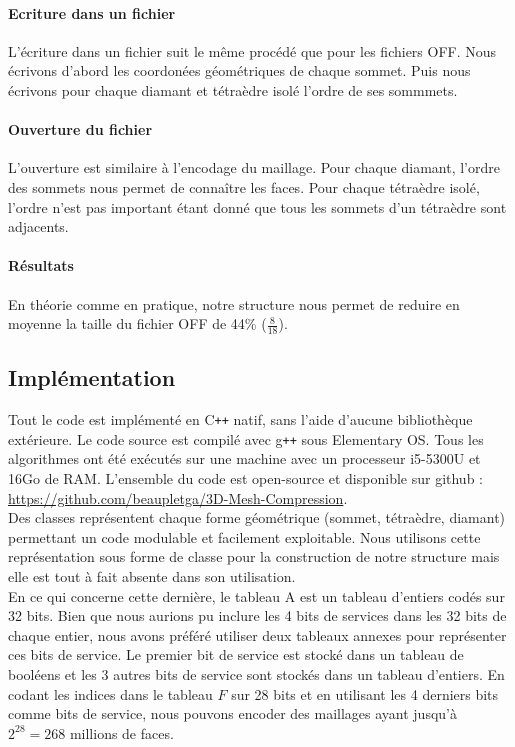 \paragraph{Ecriture dans un fichier}
L'écriture dans un fichier suit le même procédé que pour les fichiers OFF. Nous écrivons d'abord les coordonées géométriques de chaque sommet. Puis nous écrivons pour chaque diamant et tétraèdre isolé l'ordre de ses sommmets.

\paragraph{Ouverture du fichier}
L'ouverture est similaire à l'encodage du maillage. Pour chaque diamant, l'ordre des sommets nous permet de connaître les faces. Pour chaque tétraèdre isolé, l'ordre n'est pas important étant donné que tous les sommets d'un tétraèdre sont adjacents.

\paragraph{Résultats}
En théorie comme en pratique, notre structure nous permet de reduire en moyenne la taille du fichier OFF de 44\% ($\frac{8}{18}$).

\subsection{Implémentation}
\noindent
Tout le code est implémenté en C\texttt{++} natif, sans l'aide d'aucune bibliothèque extérieure. Le code source est compilé avec g\texttt{++} sous Elementary OS. Tous les algorithmes ont été exécutés sur une machine avec un processeur i5-5300U et 16Go de RAM. L'ensemble du code est open-source et disponible sur github : \url{https://github.com/beaupletga/3D-Mesh-Compression}.\\
Des classes représentent chaque forme géométrique (sommet, tétraèdre, diamant) permettant un code modulable et facilement exploitable. Nous utilisons cette représentation sous forme de classe pour la construction de notre structure mais elle est tout à fait absente dans son utilisation. \\
En ce qui concerne cette dernière, le tableau A est un tableau d'entiers codés sur 32 bits. Bien que nous aurions pu inclure les 4 bits de services dans les 32 bits de chaque entier, nous avons préféré utiliser deux tableaux annexes pour représenter ces bits de service. Le premier bit de service est stocké dans un tableau de booléens et les 3 autres bits de service sont stockés dans un tableau d'entiers. En codant les indices dans le tableau $F$ sur 28 bits et en utilisant les 4 derniers bits comme bits de service, nous pouvons encoder des maillages ayant jusqu'à $2^{28}=268$ millions de faces.
